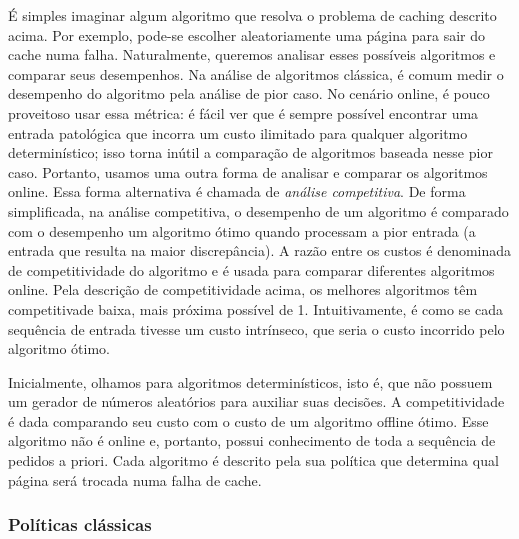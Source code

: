 É simples imaginar algum algoritmo que resolva o problema de caching descrito acima. Por exemplo, pode-se escolher aleatoriamente uma página para sair do cache numa falha. Naturalmente, queremos analisar esses possíveis algoritmos e comparar seus desempenhos. Na análise de algoritmos clássica, é comum medir o desempenho do algoritmo pela análise de pior caso. No cenário online, é pouco proveitoso usar essa métrica: é fácil ver que é sempre possível encontrar uma entrada patológica que incorra um custo ilimitado para qualquer algoritmo determinístico; isso torna inútil a comparação de algoritmos baseada nesse pior caso. Portanto, usamos uma outra forma de analisar e comparar os algoritmos online. Essa forma alternativa é chamada de \emph{análise competitiva}. 
De forma simplificada, na análise competitiva, o desempenho de um algoritmo é comparado com o desempenho um algoritmo ótimo quando processam a pior entrada (a entrada que resulta na maior discrepância). A razão entre os custos é denominada de competitividade do algoritmo e é usada para comparar diferentes algoritmos online. Pela descrição de competitividade acima, os melhores algoritmos têm competitivade baixa, mais próxima possível de 1. Intuitivamente, é como se cada sequência de entrada tivesse um custo intrínseco, que seria o custo incorrido pelo algoritmo ótimo.

Inicialmente, olhamos para algoritmos determinísticos, isto é, que não possuem um gerador de números aleatórios para auxiliar suas decisões. A competitividade é dada comparando seu custo com o custo de um algoritmo offline ótimo. Esse algoritmo não é online e, portanto, possui conhecimento de toda a sequência de pedidos a priori. Cada algoritmo é descrito pela sua política que determina qual página será trocada numa falha de cache.

\subsubsection{Políticas clássicas}

